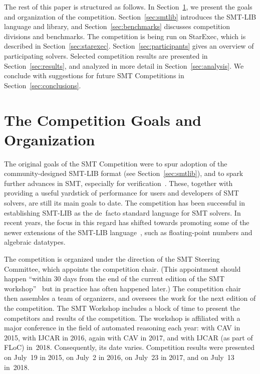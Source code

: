\documentclass[dvipsnames,table,twoside,11pt]{article}
\begin{document}
The rest of this paper is structured as follows.  In
Section~\ref{sec:goals}, we present the goals and organization of the
competition.  Section~\ref{sec:smtlib} introduces the SMT-LIB language
and library, and Section~\ref{sec:benchmarks} discusses competition
divisions and benchmarks.  The competition is being run on StarExec,
which is described in Section~\ref{sec:starexec}.
Section~\ref{sec:participants} gives an overview of participating
solvers.  Selected competition results are presented in
Section~\ref{sec:results}, and analyzed in more detail in
Section~\ref{sec:analysis}.  We conclude with suggestions for future
SMT Competitions in Section~\ref{sec:conclusions}.


\section{The Competition Goals and Organization}
\label{sec:goals}

The original goals of the SMT Competition were to spur adoption of the
community-designed SMT-LIB format (see Section~\ref{sec:smtlib}), and
to spark further advances in SMT, especially for
verification~\cite{BdMS05}.  These, together with providing a useful
yardstick of performance for users and developers of SMT solvers, are
still its main goals to date.  The competition has been successful in
establishing SMT-LIB as the de~facto standard language for SMT
solvers.  In recent years, the focus in this regard has shifted
towards promoting some of the newer extensions of the SMT-LIB
language~\cite{BarFT-RR-17}, such as floating-point numbers and
algebraic datatypes.

The competition is organized under the direction of the SMT Steering
Committee, which appoints the competition chair.  (This appointment
should happen ``within 30 days from the end of the current edition of
the SMT workshop''~\cite{smt-bylaws} but in practice has often
happened later.)  The competition chair then assembles a team of
organizers, and oversees the work for the next edition of the
competition.
%
The SMT Workshop includes a block of time to present the competitors
and results of the competition.  The workshop is affiliated with a
major conference in the field of automated reasoning each year: with
CAV in 2015, with IJCAR in 2016, again with CAV in 2017, and with
IJCAR (as part of FLoC) in~2018.  Consequently, its date varies.
Competition results were presented on July~19 in 2015, on July~2 in
2016, on July~23 in 2017, and on July~13 in~2018.
\end{document}
